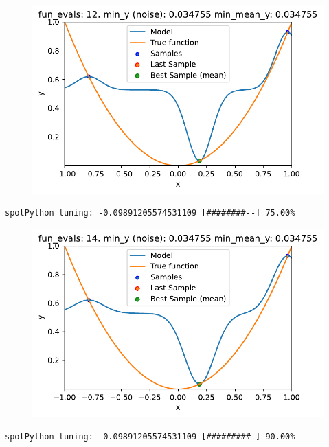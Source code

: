 \documentclass[
  letterpaper,
  DIV=11,
  numbers=noendperiod]{scrreprt}
\begin{document}
\begin{figure}[H]

{\centering \includegraphics{014_num_spot_ocba_files/figure-pdf/cell-6-output-6.pdf}

}

\end{figure}

\begin{verbatim}
spotPython tuning: -0.09891205574531109 [########--] 75.00% 
\end{verbatim}

\begin{figure}[H]

{\centering \includegraphics{014_num_spot_ocba_files/figure-pdf/cell-6-output-8.pdf}

}

\end{figure}

\begin{verbatim}
spotPython tuning: -0.09891205574531109 [#########-] 90.00% 
\end{verbatim}
\end{document}
